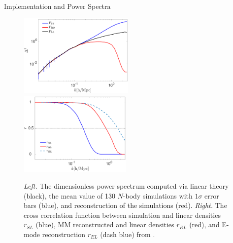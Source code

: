 \begin{section}{Implementation and Power Spectra}
  \begin{figure}
    \centering
    \includegraphics[width=0.5\textwidth]{fig2a.pdf}
    \includegraphics[width=0.49\textwidth]{fig2b.pdf}
    \caption{{\it Left.} The dimensionless power spectrum computed via
      linear theory (black), the mean value of 130 $N$-body
      simulations with $1\sigma$ error bars (blue), and reconstruction
      of the simulations (red).  {\it Right.} The cross correlation
      function between simulation and linear densities $r_{SL}$ (blue),
      MM reconstructed and linear densities $r_{RL}$ (red), and E-mode reconstruction $r_{EL}$ (dash
      blue) from \citet{bib:Yu2016}.}
    \label{fig:cp}
  \end{figure}


\end{section}

